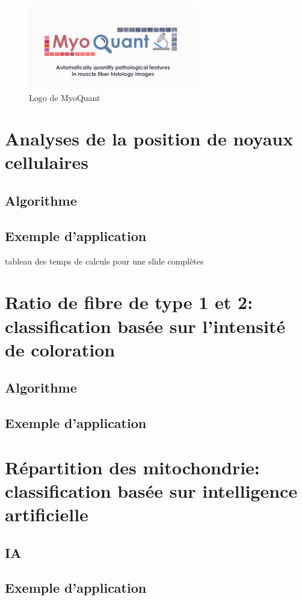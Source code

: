 \begin{figure}[htbp]
 \centering
 \includegraphics[width=0.66\textwidth]{figures/myoquant_logo.png}
 \caption[Logo MyoQuant]{Logo de MyoQuant}
 \label{fig:myoquant_logo}
\end{figure}

\section{Analyses de la position de noyaux cellulaires}
\subsection{Algorithme}
\subsection{Exemple d'application}
tableau des temps de calculs pour une slide complètes
\section{Ratio de fibre de type 1 et 2: classification basée sur l'intensité de coloration}
\subsection{Algorithme}
\subsection{Exemple d'application}
\section{Répartition des mitochondrie: classification basée sur intelligence artificielle}
\subsection{IA}
\subsection{Exemple d'application}
